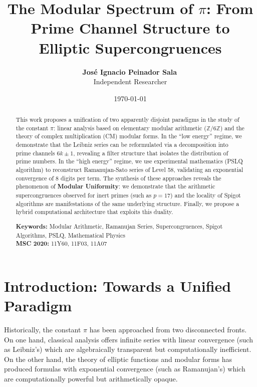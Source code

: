 \documentclass[12pt, a4paper]{article}
\title{The Modular Spectrum of $\pi$: From Prime Channel Structure to Elliptic Supercongruences}
\author{
  \textbf{José Ignacio Peinador Sala}\,\orcidlink{0009-0008-1822-3452} \\
  Independent Researcher \\  
}
\date{\today}
\theoremstyle{plain}
\theoremstyle{definition}
\theoremstyle{remark}
\numberwithin{equation}{section}
\begin{document}
\maketitle

\begin{abstract}
This work proposes a unification of two apparently disjoint paradigms in the study of the constant $\pi$: linear analysis based on elementary modular arithmetic ($\mathbb{Z}/6\mathbb{Z}$) and the theory of complex multiplication (CM) modular forms. In the ``low energy'' regime, we demonstrate that the Leibniz series can be reformulated via a decomposition into prime channels $6k \pm 1$, revealing a filter structure that isolates the distribution of prime numbers. In the ``high energy'' regime, we use experimental mathematics (PSLQ algorithm) to reconstruct Ramanujan-Sato series of Level 58, validating an exponential convergence of 8 digits per term. The synthesis of these approaches reveals the phenomenon of \textbf{Modular Uniformity}: we demonstrate that the arithmetic supercongruences observed for inert primes (such as $p=17$) and the locality of Spigot algorithms are manifestations of the same underlying structure. Finally, we propose a hybrid computational architecture that exploits this duality.

\vspace{0.5cm}
\noindent\textbf{Keywords:} Modular Arithmetic, Ramanujan Series, Supercongruences, Spigot Algorithms, PSLQ, Mathematical Physics \\
\noindent\textbf{MSC 2020:} 11Y60, 11F03, 11A07
\end{abstract}

\section{Introduction: Towards a Unified Paradigm}

Historically, the constant $\pi$ has been approached from two disconnected fronts. On one hand, classical analysis offers infinite series with linear convergence (such as Leibniz's) which are algebraically transparent but computationally inefficient. On the other hand, the theory of elliptic functions and modular forms has produced formulas with exponential convergence (such as Ramanujan's) which are computationally powerful but arithmetically opaque.
\end{document}
